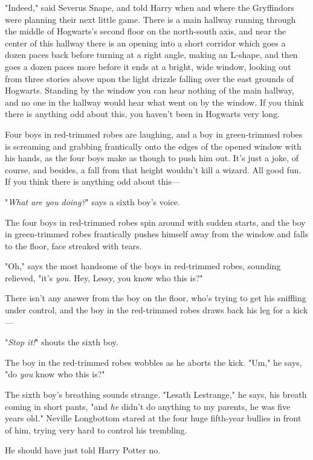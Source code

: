 "Indeed," said Severus Snape, and told Harry when and where the Gryffindors
were planning their next little game.
\sbreak
There is a main hallway running through the middle of Hogwarts's second floor
on the north-south axis, and near the center of this hallway there is an
opening into a short corridor which goes a dozen paces back before turning at a
right angle, making an L-shape, and then goes a dozen paces more before it ends
at a bright, wide window, looking out from three stories above upon the light
drizzle falling over the east grounds of Hogwarts. Standing by the window you
can hear nothing of the main hallway, and no one in the hallway would hear what
went on by the window. If you think there is anything odd about this, you
haven't been in Hogwarts very long.

Four boys in red-trimmed robes are laughing, and a boy in green-trimmed robes
is screaming and grabbing frantically onto the edges of the opened window with
his hands, as the four boys make as though to push him out. It's just a joke,
of course, and besides, a fall from that height wouldn't kill a wizard. All
good fun. If you think there is anything odd about this\mbox{---}

"\emph{What are you doing?}" says a sixth boy's voice.

The four boys in red-trimmed robes spin around with sudden starts, and the boy
in green-trimmed robes frantically pushes himself away from the window and
falls to the floor, face streaked with tears.

"Oh," says the most handsome of the boys in red-trimmed robes, sounding
relieved, "it's \emph{you.} Hey, Lessy, you know who this is?"

There isn't any answer from the boy on the floor, who's trying to get his
sniffling under control, and the boy in the red-trimmed robes draws back his
leg for a kick\mbox{---}

"\emph{Stop it!}" shouts the sixth boy.

The boy in the red-trimmed robes wobbles as he aborts the kick. "Um," he says,
"do \emph{you} know who this is?"

The sixth boy's breathing sounds strange. "Lesath Lestrange," he says, his
breath coming in short pants, "and \emph{he} didn't do anything to my parents,
he was five years old."
\sbreak
Neville Longbottom stared at the four huge fifth-year bullies in front of him,
trying very hard to control his trembling.

He should have just told Harry Potter no.


